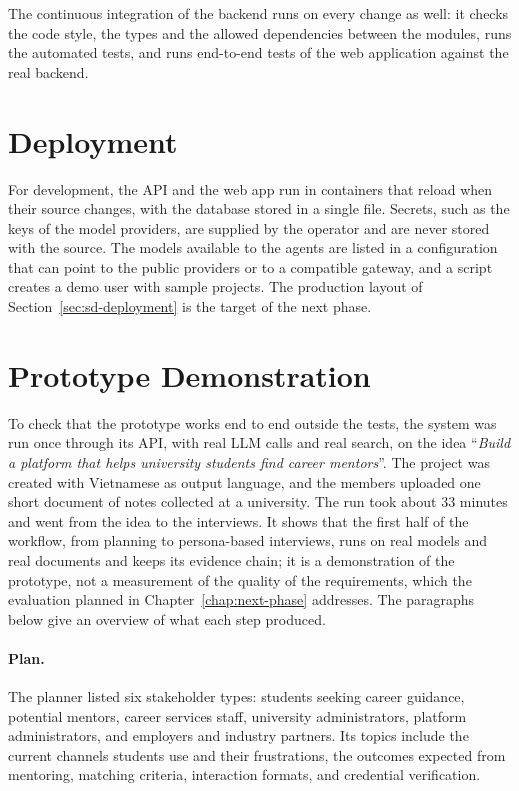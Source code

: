 The continuous integration of the backend runs on every change as well: it checks the code style, the types and the allowed dependencies between the modules, runs the automated tests, and runs end-to-end tests of the web application against the real backend.

\section{Deployment}
\label{sec:impl-deployment}

For development, the API and the web app run in containers that reload when their source changes, with the database stored in a single file. Secrets, such as the keys of the model providers, are supplied by the operator and are never stored with the source. The models available to the agents are listed in a configuration that can point to the public providers or to a compatible gateway, and a script creates a demo user with sample projects. The production layout of Section~\ref{sec:sd-deployment} is the target of the next phase.

\section{Prototype Demonstration}
\label{sec:impl-demo}
\label{sec:eval-case-study}

To check that the prototype works end to end outside the tests, the system was run once through its API, with real LLM calls and real search, on the idea ``\textit{Build a platform that helps university students find career mentors}''. The project was created with Vietnamese as output language, and the members uploaded one short document of notes collected at a university. The run took about 33 minutes and went from the idea to the interviews. It shows that the first half of the workflow, from planning to persona-based interviews, runs on real models and real documents and keeps its evidence chain; it is a demonstration of the prototype, not a measurement of the quality of the requirements, which the evaluation planned in Chapter~\ref{chap:next-phase} addresses. The paragraphs below give an overview of what each step produced.

\paragraph{Plan.} The planner listed six stakeholder types: students seeking career guidance, potential mentors, career services staff, university administrators, platform administrators, and employers and industry partners. Its topics include the current channels students use and their frustrations, the outcomes expected from mentoring, matching criteria, interaction formats, and credential verification.

